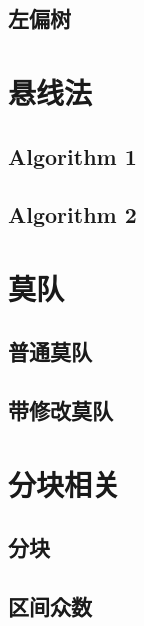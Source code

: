 \documentclass{article}
\begin{document}
		\subsection{左偏树}
	\newpage

	\section{悬线法}
		\subsection{Algorithm 1}
		\subsection{Algorithm 2}

	\newpage

	\section{莫队}
		\subsection{普通莫队}
		\subsection{带修改莫队}

	\newpage

	\section{分块相关}
		\subsection{分块}
		\subsection{区间众数}
\end{document}
